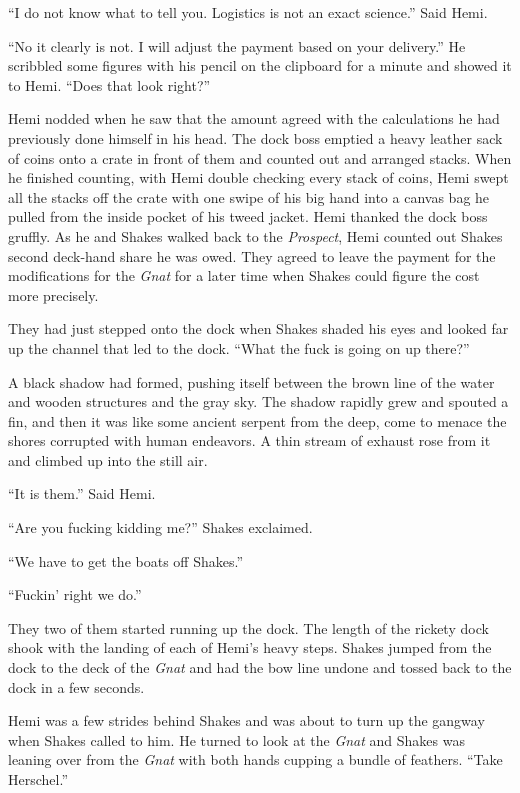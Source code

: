 \documentclass[
]{scrbook}
\begin{document}
``I do not know what to tell you. Logistics is not an exact science.''
Said Hemi.

``No it clearly is not. I will adjust the payment based on your
delivery.'' He scribbled some figures with his pencil on the clipboard
for a minute and showed it to Hemi. ``Does that look right?''

Hemi nodded when he saw that the amount agreed with the calculations he
had previously done himself in his head. The dock boss emptied a heavy
leather sack of coins onto a crate in front of them and counted out and
arranged stacks. When he finished counting, with Hemi double checking
every stack of coins, Hemi swept all the stacks off the crate with one
swipe of his big hand into a canvas bag he pulled from the inside pocket
of his tweed jacket. Hemi thanked the dock boss gruffly. As he and
Shakes walked back to the \emph{Prospect}, Hemi counted out Shakes
second deck-hand share he was owed. They agreed to leave the payment for
the modifications for the \emph{Gnat} for a later time when Shakes could
figure the cost more precisely.

They had just stepped onto the dock when Shakes shaded his eyes and
looked far up the channel that led to the dock. ``What the fuck is going
on up there?''

A black shadow had formed, pushing itself between the brown line of the
water and wooden structures and the gray sky. The shadow rapidly grew
and spouted a fin, and then it was like some ancient serpent from the
deep, come to menace the shores corrupted with human endeavors. A thin
stream of exhaust rose from it and climbed up into the still air.

``It is them.'' Said Hemi.

``Are you fucking kidding me?'' Shakes exclaimed.

``We have to get the boats off Shakes.''

``Fuckin' right we do.''

They two of them started running up the dock. The length of the rickety
dock shook with the landing of each of Hemi's heavy steps. Shakes jumped
from the dock to the deck of the \emph{Gnat} and had the bow line undone
and tossed back to the dock in a few seconds.

Hemi was a few strides behind Shakes and was about to turn up the
gangway when Shakes called to him. He turned to look at the \emph{Gnat}
and Shakes was leaning over from the \emph{Gnat} with both hands cupping
a bundle of feathers. ``Take Herschel.''
\end{document}
